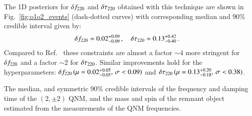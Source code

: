 The 1D posteriors for $\delta f_{\text{220}}$ and $ \delta \tau_{\text{220}}$ obtained with this technique are shown in Fig.~\ref{fig:o1o2_events} (dash-dotted curves) with corresponding median and 90\% credible interval given by: 
%
\begin{equation}
\delta f_{\text{220}}=0.02^{+0.09}_{-0.09}\,,\quad \delta \tau_{\text{220}}=0.13^{+0.42}_{-0.40}\,.
\end{equation}
Compared to Ref.~\cite{Abbott:2020jks} these constraints are almost a factor $\sim 4$ more stringent for $\delta f_{\text{220}}$ and a factor $\sim 2$ for $\delta \tau_{\text{220}}$. Similar improvements hold for the hyperparameters: $\delta f_{\text{220}}\,(\mu=0.02^{+0.05}_{-0.05},\,\sigma<0.09)$ and $\delta \tau_{\text{220}}\,(\mu=0.13^{+0.20}_{-0.18},\,\sigma<0.38)$.


\begin{table}

\caption{The median, and symmetric 90\% credible intervals of the frequency and damping time of the $(2,\pm2)$ QNM, and the mass and spin of the remnant object estimated from the measurements of the QNM frequencies.}
\label{tab:qnm_o1o2_results}
\end{table}

